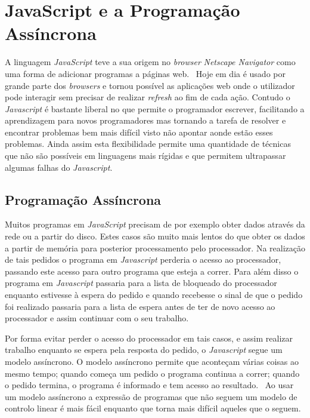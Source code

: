 \section{JavaScript e a Programação Assíncrona}
A linguagem \textit{JavaScript} teve a sua origem no \textit{browser} \textit{Netscape Navigator} como uma forma de adicionar programas a páginas web.~\cite{elojs} Hoje em dia é usado por grande parte dos \textit{browsers} e tornou possível as aplicações web onde o utilizador pode interagir sem precisar de realizar \textit{refresh} ao fim de cada ação.
Contudo o \textit{Javascript} é bastante liberal no que permite o programador escrever, facilitando a aprendizagem para novos programadores mas tornando a tarefa de resolver e encontrar problemas bem mais difícil visto não apontar aonde estão esses problemas. Ainda assim esta flexibilidade permite uma quantidade de técnicas que não são possíveis em linguagens mais rígidas e que permitem ultrapassar algumas falhas do \textit{Javascript}.~\cite{elojs} 

\subsection{Programação Assíncrona}
Muitos programas em \textit{JavaScript} precisam de por exemplo obter dados através da rede ou a partir do disco. Estes casos são muito mais lentos do que obter os dados a partir de memória para posterior processamento pelo processador. Na realização de tais pedidos o programa em \textit{Javascript} perderia o acesso ao processador, passando este acesso para outro programa que esteja a correr. Para além disso o programa em \textit{Javascript} passaria para a lista de bloqueado do processador enquanto estivesse à espera do pedido e quando recebesse o sinal de que o pedido foi realizado passaria para a lista de espera antes de ter de novo acesso ao processador e assim continuar com o seu trabalho.

Por forma evitar perder o acesso do processador em tais casos, e assim realizar trabalho enquanto se espera pela resposta do pedido, o \textit{Javascript} segue um modelo assíncrono. O modelo assíncrono permite que aconteçam várias coisas ao mesmo tempo; quando começa um pedido o programa continua a correr; quando o pedido termina, o programa é informado e tem acesso ao resultado.~\cite{elojs} Ao usar um modelo assíncrono a expressão de programas que não seguem um modelo de controlo linear é mais fácil enquanto que torna mais difícil aqueles que o seguem.~\cite{elojs}

